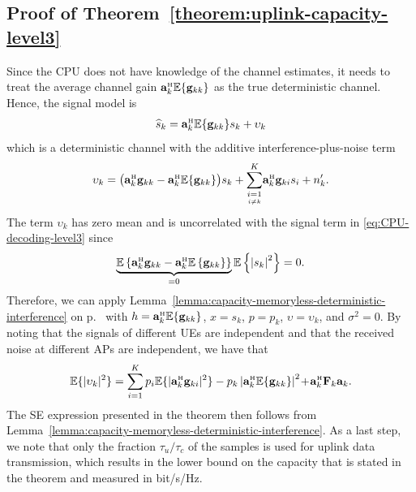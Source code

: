 \documentclass[SIG,biber]{nowfnt}
\newcommand{\vect}[1]{\mathbf{#1}}
\newcommand{\condSum}[3]{\overset{#3}{\underset{\underset{#2}{#1}}{\sum}}}
\def\Htran{\mbox{\tiny $\mathrm{H}$}}
\begin{document}
\subsection{Proof of Theorem~\ref{theorem:uplink-capacity-level3}}\label{proof-of-proposition:uplink-capacity-level3}

Since the CPU does not have knowledge of the channel estimates, it needs to treat the average channel gain $\vect{a}_{k}^{\Htran}\mathbb{E}\{\vect{g}_{kk}\}$ as the true deterministic channel. Hence, the signal model is
\begin{equation} \label{eq:CPU-decoding-level3}
\widehat{s}_k = \vect{a}_{k}^{\Htran}\mathbb{E}\{\vect{g}_{kk}\}  s_k + \upsilon_k
\end{equation}
which is a deterministic channel with the additive interference-plus-noise term
\begin{align}  \upsilon_k 
=  \big(\vect{a}_{k}^{\Htran}\vect{g}_{kk} -  \vect{a}_{k}^{\Htran} \mathbb{E}\{ \vect{g}_{kk}\}\big) s_k+ 
\condSum{i=1}{i \neq k}{K} \vect{a}_{k}^{\Htran}  \vect{g}_{ki} s_i +  n^\prime_{k}.
\end{align}
The term $\upsilon_k$ has zero mean and is uncorrelated with the signal term in \eqref{eq:CPU-decoding-level3} since
\begin{align}
\underbrace{\mathbb{E}\left\{ \vect{a}_{k}^{\Htran}\vect{g}_{kk} -  \vect{a}_{k}^{\Htran} \mathbb{E}\left\{ \vect{g}_{kk}\right\}\right\}}_{=0}\mathbb{E}\left\{\left|s_k\right|^2\right\} = 0.
\end{align}
Therefore, we can apply Lemma~\ref{lemma:capacity-memoryless-deterministic-interference} on p.~\pageref{lemma:capacity-memoryless-deterministic-interference} with $h =  \vect{a}_{k}^{\Htran}\mathbb{E}\{\vect{g}_{kk}\}$, $x= s_k$, $p=p_k$, $\upsilon = \upsilon_k$, and $\sigma^2=0$.
By noting that the signals of different UEs are independent and that the received noise at different APs are independent, we have that
\begin{equation}
\mathbb{E} \{ |\upsilon_k |^2 \} = \sum\limits_{i=1}^{K} p_{i} \mathbb{E} \{  |\vect{a}_{k}^{\Htran}\vect{g}_{ki}|^2  \} - p_{k} \left| \vect{a}_{k}^{\Htran} \mathbb{E}\{ \vect{g}_{kk}\} \right|^2 \!+\!  \vect{a}_{k}^{\Htran}\vect{F}_{k}
		\vect{a}_{k} .
\end{equation}
The SE expression presented in the theorem then follows from Lemma~\ref{lemma:capacity-memoryless-deterministic-interference}.  As a last step, we note that only the fraction $\tau_u/\tau_c$ of the samples is used for uplink data transmission, which results in the lower bound on the capacity that is stated in the theorem and measured in bit/s/Hz.
\end{document}
